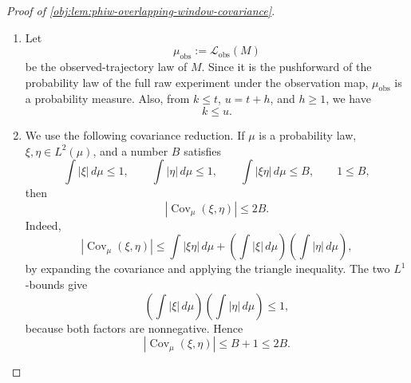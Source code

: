 \begin{proof}[Proof of \cref{obj:lem:phiw-overlapping-window-covariance}]
\begin{enumerate}
\item Let
\[
\mu_{\mathrm{obs}}:=\mathcal L_{\mathrm{obs}}(M)
\]
be the observed-trajectory law of \(M\). Since it is the pushforward of the probability law of the full raw experiment under the observation map, \(\mu_{\mathrm{obs}}\) is a probability measure. Also, from \(k\le t\), \(u=t+h\), and \(h\ge 1\), we have
\[
k\le u .
\]

\item We use the following covariance reduction. If \(\mu\) is a probability law, \(\xi,\eta\in L^2(\mu)\), and a number \(B\) satisfies
\[
\int |\xi|\,d\mu\le 1,\qquad
\int |\eta|\,d\mu\le 1,\qquad
\int |\xi\eta|\,d\mu\le B,\qquad
1\le B,
\]
then
\[
|\operatorname{Cov}_{\mu}(\xi,\eta)|\le 2B .
\]
Indeed,
\[
|\operatorname{Cov}_{\mu}(\xi,\eta)|
\le
\int |\xi\eta|\,d\mu
+
\left(\int |\xi|\,d\mu\right)
\left(\int |\eta|\,d\mu\right),
\]
by expanding the covariance and applying the triangle inequality. The two \(L^1\)-bounds give
\[
\left(\int |\xi|\,d\mu\right)
\left(\int |\eta|\,d\mu\right)\le 1,
\]
because both factors are nonnegative. Hence
\[
|\operatorname{Cov}_{\mu}(\xi,\eta)|
\le B+1\le 2B .
\]


\end{enumerate}
\end{proof}
